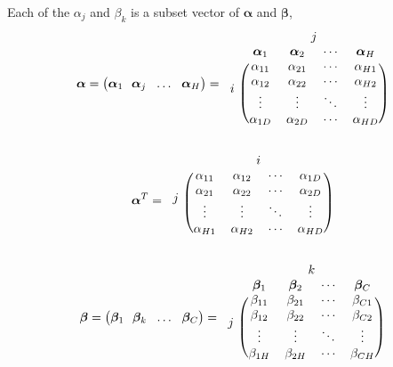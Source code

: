 \documentclass[12pt,a4paper]{article}%
\theoremstyle{definition}
\theoremstyle{plain}
\numberwithin{equation}{section}
\begin{document}
Each of the $\alpha_{j}$ and $\beta_{k}$ is a subset vector of $\boldsymbol{\alpha}$ and $\boldsymbol{\beta}$,
\begin{equation*}
\boldsymbol{\alpha} = \big( \boldsymbol{\alpha}_{1} ~~ \boldsymbol{\alpha}_{j} ~~ \dots ~~ \boldsymbol{\alpha}_{H} \big) = 
\begin{blockarray}{ccccc}
  & \multicolumn{4}{c}{$j$}  \\
  & \boldsymbol{\alpha}_{1} & \boldsymbol{\alpha}_{2}  & \cdots & \boldsymbol{\alpha}_{H} \\
\begin{block}{c(cccc)}
\multirow{4}{*}{$i$} & \alpha_{11} & \alpha_{21} & \cdots & \alpha_{H1} \\
  					 & \alpha_{12} & \alpha_{22} & \cdots & \alpha_{H2} \\
			     	 & \vdots      & \vdots      & \ddots & \vdots  \\
				     & \alpha_{1D} & \alpha_{2D} & \cdots & \alpha_{HD} \\
\end{block}
\end{blockarray}
\end{equation*}

\begin{equation*}
\boldsymbol{\alpha}^{T} = 
\begin{blockarray}{ccccc}
  & \multicolumn{4}{c}{$i$}  \\
\begin{block}{c(cccc)}
\multirow{4}{*}{$j$} & \alpha_{11} & \alpha_{12} & \cdots & \alpha_{1D} \\
  					 & \alpha_{21} & \alpha_{22} & \cdots & \alpha_{2D} \\
			     	 & \vdots      & \vdots      & \ddots & \vdots  \\
				     & \alpha_{H1} & \alpha_{H2} & \cdots & \alpha_{HD} \\
\end{block}
\end{blockarray}
\end{equation*}

\begin{equation*}
\boldsymbol{\beta} = \big( \boldsymbol{\beta}_{1} ~~ \boldsymbol{\beta}_{k} ~~ \dots ~~ \boldsymbol{\beta}_{C} \big) = 
\begin{blockarray}{ccccc}
  & \multicolumn{4}{c}{$k$}  \\
  & \boldsymbol{\beta}_{1} & \boldsymbol{\beta}_{2}  & \cdots & \boldsymbol{\beta}_{C} \\
\begin{block}{c(cccc)}
\multirow{4}{*}{$j$}  & \beta_{11} & \beta_{21} & \cdots & \beta_{C1} \\
  			          & \beta_{12} & \beta_{22} & \cdots & \beta_{C2} \\
 		  			  & \vdots      & \vdots      & \ddots & \vdots  \\
			          & \beta_{1H} & \beta_{2H} & \cdots & \beta_{CH} \\
\end{block}
\end{blockarray}
\end{equation*}
\end{document}
